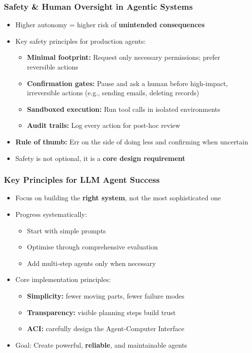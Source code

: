 
\begin{frame}[fragile]\frametitle{Safety \& Human Oversight in Agentic Systems}
      \begin{itemize}
        \item Higher autonomy = higher risk of \textbf{unintended consequences}
        \item Key safety principles for production agents:
        \begin{itemize}
            \item \textbf{Minimal footprint:} Request only necessary permissions; prefer reversible actions
            \item \textbf{Confirmation gates:} Pause and ask a human before high-impact, irreversible actions (e.g., sending emails, deleting records)
            \item \textbf{Sandboxed execution:} Run tool calls in isolated environments
            \item \textbf{Audit trails:} Log every action for post-hoc review
        \end{itemize}
        \item \textbf{Rule of thumb:} Err on the side of doing less and confirming when uncertain
        \item Safety is not optional, it is a \textbf{core design requirement}
      \end{itemize}
\end{frame}

\begin{frame}[fragile]\frametitle{Key Principles for LLM Agent Success}
    \begin{itemize}
        \item Focus on building the \textbf{right system}, not the most sophisticated one
        \item Progress systematically:
            \begin{itemize}
                \item Start with simple prompts
                \item Optimise through comprehensive evaluation
                \item Add multi-step agents only when necessary
            \end{itemize}
        \item Core implementation principles:
            \begin{itemize}
                \item \textbf{Simplicity:} fewer moving parts, fewer failure modes
                \item \textbf{Transparency:} visible planning steps build trust
                \item \textbf{ACI:} carefully design the Agent-Computer Interface
            \end{itemize}
        \item Goal: Create powerful, \textbf{reliable}, and maintainable agents
    \end{itemize}
\end{frame}

